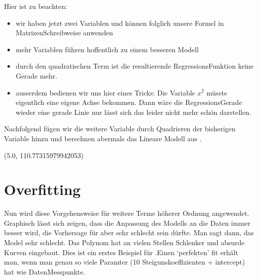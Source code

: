 \documentclass[letterpaper,10pt,english]{jupyterBook}
\begin{document}
\sphinxAtStartPar
Hier ist zu beachten:
\begin{itemize}
\item {} 
\sphinxAtStartPar
wir haben jetzt zwei Variablen und können folglich unsere Formel in Matrizen\sphinxhyphen{}Schreibweise anwenden

\item {} 
\sphinxAtStartPar
mehr Variablen führen hoffentlich zu einem besseren Modell

\item {} 
\sphinxAtStartPar
durch den quadratischen Term ist die resultierende Regressions\sphinxhyphen{}Funktion keine Gerade mehr.

\item {} 
\sphinxAtStartPar
ausserdem bedienen wir uns hier eines Tricks: Die Variable \(x^2\) müsste eigentlich eine eigene Achse bekommen. Dann wäre die Regressions\sphinxhyphen{}Gerade wieder eine gerade Linie \sphinxhyphen{} nur lässt sich das leider nicht mehr schön darstellen.

\end{itemize}

\sphinxAtStartPar
Nachfolgend fügen wir die weitere Variable durch Quadrieren der bisherigen Variable hinzu und berechnen abermals das Lineare Modell aus .

\begin{sphinxVerbatim}[commandchars=\\\{\}]
(\PYGZhy{}5.0, 110.77315979942053)
\end{sphinxVerbatim}

\noindent{}


\section{Overfitting}
\label{\detokenize{Regression_Techniques:overfitting}}
\sphinxAtStartPar
Nun wird diese Vorgehensweise für weitere Terme höherer Ordnung angewendet. Graphisch lässt sich zeigen, dass die Anpassung des Modells an die Daten immer besser wird, die Vorhersage für  aber sehr schlecht sein dürfte. Man sagt dann, das Model  sehr schlecht. Das Polynom hat an vielen Stellen Schlenker und absurde Kurven eingebaut. Dies ist ein erstes Beispiel für .Einen ‘perfekten’ fit erhält man, wenn man genau so viele Paramter (10 Steigunskoeffizienten + intercept) hat wie Daten\sphinxhyphen{}Messpunkte.
\end{document}

